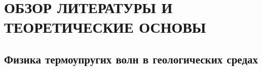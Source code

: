\section{ОБЗОР ЛИТЕРАТУРЫ И ТЕОРЕТИЧЕСКИЕ ОСНОВЫ}

\subsection{Физика термоупругих волн в геологических средах}
